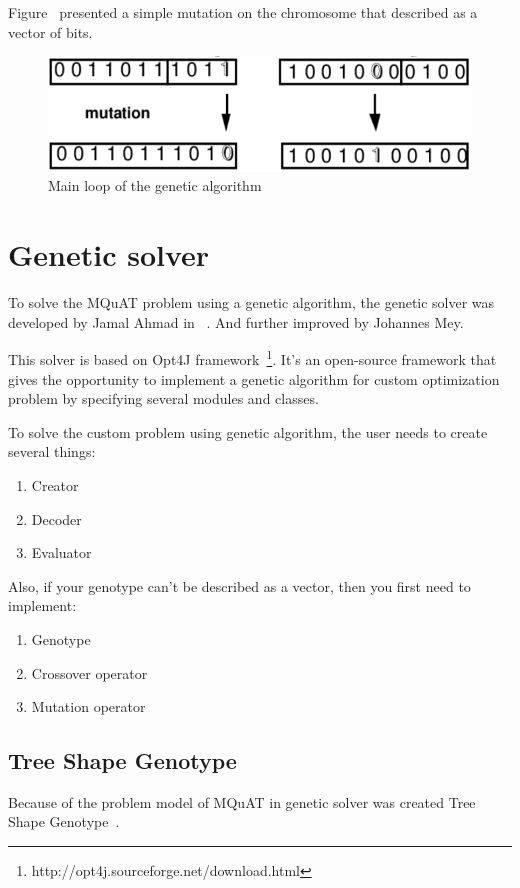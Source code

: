 Figure~\label{fig:MutationVector} presented a simple mutation on the chromosome that described as a vector of bits.

\begin{figure}
	\centering
	\includegraphics[width=\textwidth]{images/MutationVector.png}
	\caption{Main loop of the genetic algorithm}
	\label{fig:MutationVector}
\end{figure}


\section{Genetic solver}
To solve the MQuAT problem using a genetic algorithm, the genetic solver was developed by Jamal Ahmad in ~\cite{ahmad18}. And further improved by Johannes Mey.

This solver is based on Opt4J framework~\footnote{http://opt4j.sourceforge.net/download.html}. It's an open-source framework that gives the opportunity to implement a genetic algorithm for custom optimization problem by specifying several modules and classes.

To solve the custom problem using genetic algorithm, the user needs to create several things:
\begin{enumerate}
	\item Creator
	\item Decoder
	\item Evaluator
\end{enumerate}
Also, if your genotype can't be described as a vector, then you first need to implement:
\begin{enumerate}
	\item Genotype
	\item Crossover operator
	\item Mutation operator
\end{enumerate}

\subsection{Tree Shape Genotype}
Because of the problem model of MQuAT in genetic solver was created Tree Shape Genotype~\cite{ahmad18}.

